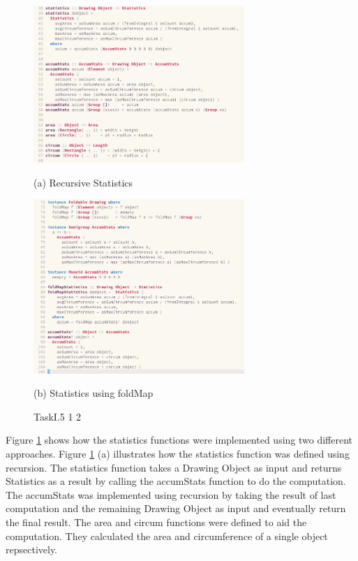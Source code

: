 \documentclass{article}
\begin{document}
\begin{normalsize}
\begin{figure}[H]
    \begin{minipage}[b]{0.48\linewidth}
      \centering
      \centerline{\includegraphics[width=8.0cm]{Stats}}
      \centerline{ (a) Recursive Statistics}\medskip
    \end{minipage}
    \hfill
    \begin{minipage}[b]{0.48\linewidth}
      \centering
      \centerline{\includegraphics[width=8.0cm]{StatsFoldMap}}
      \centerline{ (b) Statistics using foldMap}\medskip
    \end{minipage}
    \caption{TaskI.5 1 2}
    \label{fig:taskI.5.1.2}
  \end{figure}

  Figure \ref{fig:taskI.5.1.2} shows how the statistics functions were implemented using two different approaches. Figure \ref{fig:taskI.5.1.2} (a)
  illustrates how the statistics function was defined using recursion. The statistics function takes a Drawing Object as input and returns Statistics as a result by calling the accumStats function to do the computation. The
  accumStats was implemented using recursion by taking the result of last computation and the remaining Drawing Object as input and eventually return the final result. The area and circum functions were defined to aid the computation. They calculated the area and circumference of a single object repsectively.


\end{normalsize}
\end{document}
